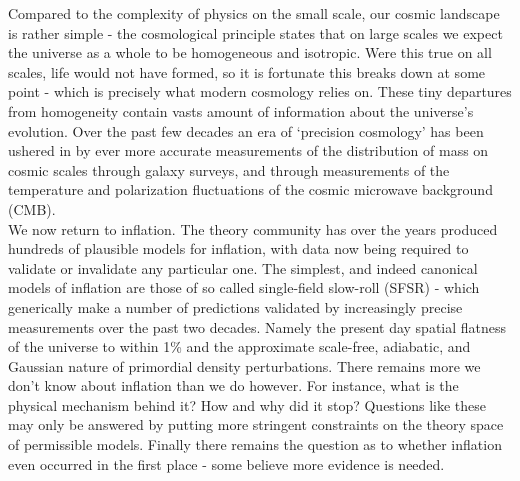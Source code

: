 \documentclass[a4paper,10pt]{article}
\begin{document}
Compared to the complexity of physics on the small scale, our cosmic landscape is rather simple - the cosmological principle states that on large scales we expect the universe as a whole to be homogeneous and isotropic. Were this true on all scales, life would not have formed, so it is fortunate this breaks down at some point - which is precisely what modern cosmology relies on. These tiny departures from homogeneity contain vasts amount of information about the universe's evolution. Over the past few decades an era of `precision cosmology' has been ushered in by ever more accurate measurements of the distribution of mass on cosmic scales through galaxy surveys, and through measurements of the temperature and polarization fluctuations of the cosmic microwave background (CMB). \\

We now return to inflation. The theory community has over the years produced hundreds of plausible models for inflation, with data now being required to validate or invalidate any particular one. The simplest, and indeed canonical models of inflation are those of so called single-field slow-roll (SFSR) - which generically make a number of predictions validated by increasingly precise measurements over the past two decades. Namely the present day spatial flatness of the universe to within 1\% and the approximate scale-free, adiabatic, and Gaussian nature of primordial density perturbations. There remains more we don't know about inflation than we do however. For instance, what is the physical mechanism behind it? How and why did it stop? Questions like these may only be answered by putting more stringent constraints on the theory space of permissible models. Finally there remains the question as to whether inflation even occurred in the first place - some believe more evidence is needed.\\
\end{document}
